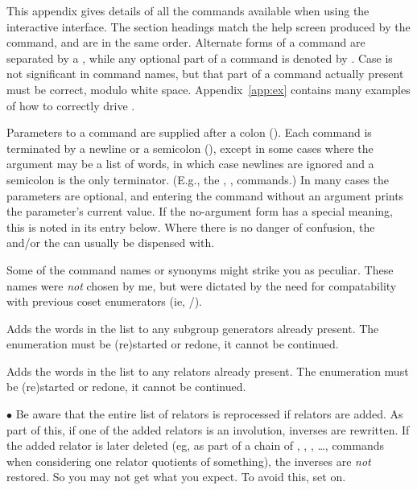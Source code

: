 
%
%

This appendix gives details of all the commands available when
  using the interactive interface.
The section headings match the help screen produced by the 
  command, and are in the same order.
%
Alternate forms of a command are separated by a \ttt{/}\kern-1pt, while
  any optional part of a command is denoted by \ttt{[\dots]}.
Case is not significant in command names, but that part of a command
  actually present must be correct, modulo white space.
%
Appendix~\ref{app:ex} contains many examples of how to correctly drive
  \ace.

Parameters to a command are supplied after a colon (\ttt{:}).  
Each command is terminated by a newline or a semicolon (\ttt{;}), except
  in some cases where the argument may be a list of words, in which case
  newlines are ignored and a semicolon is the only terminator.
(E.g., the , ,  \amp {}
  commands.)
In many cases the parameters are optional, and entering the command
  without an argument prints the parameter's current value.
If the no-argument form has a special meaning, this is noted in its entry
  below.
Where there is no danger of confusion, the \ttt{:} and/or the \ttt{;} can
  usually be dispensed with.

Some of the command names or synonyms might strike you as peculiar.
These names were \emph{not} chosen by me, but were dictated by the need
  for compatability with previous coset enumerators (ie,  \amp
  /).

\quad{}

Adds the words in the list to any subgroup generators already present.
The enumeration must be (re)started or redone, it cannot be continued.

\quad{}

Adds the words in the list to any relators already present.
The enumeration must be (re)started or redone, it cannot be continued.

$\bullet$
Be aware that the entire list of relators is reprocessed if relators are
  added.
As part of this, if one of the added relators is an involution, inverses
  are rewritten.
If the added relator is later deleted (eg, as part of a chain of 
  ,  ,  , \dots, commands
  when considering one relator quotients of something), the inverses are
  \emph{not} restored.
So you may not get what you expect.
To avoid this, set  on.

